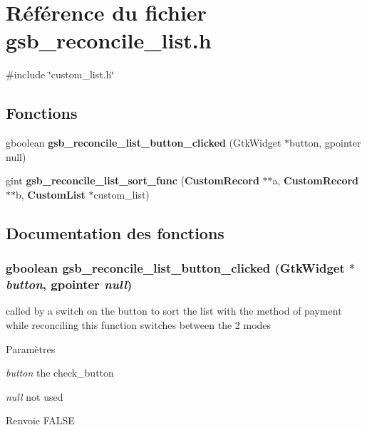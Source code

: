 \section{Référence du fichier gsb\_\-reconcile\_\-list.h}
\label{gsb__reconcile__list_8h}
{\ttfamily \#include \char`\"{}custom\_\-list.h\char`\"{}}\par
\subsection*{Fonctions}
\begin{DoxyCompactItemize}
\item 
gboolean {\bf gsb\_\-reconcile\_\-list\_\-button\_\-clicked} (GtkWidget $\ast$button, gpointer null)
\item 
gint {\bf gsb\_\-reconcile\_\-list\_\-sort\_\-func} ({\bf CustomRecord} $\ast$$\ast$a, {\bf CustomRecord} $\ast$$\ast$b, {\bf CustomList} $\ast$custom\_\-list)
\end{DoxyCompactItemize}


\subsection{Documentation des fonctions}
\subsubsection[{gsb\_\-reconcile\_\-list\_\-button\_\-clicked}]{\setlength{\rightskip}{0pt plus 5cm}gboolean gsb\_\-reconcile\_\-list\_\-button\_\-clicked (GtkWidget $\ast$ {\em button}, \/  gpointer {\em null})}\label{gsb__reconcile__list_8h_a247eaf28cea2bed53eb6048878100f35}
called by a switch on the button to sort the list with the method of payment while reconciling this function switches between the 2 modes


\begin{DoxyParams}{Paramètres}
\item[{\em button}]the check\_\-button \item[{\em null}]not used\end{DoxyParams}
\begin{DoxyReturn}{Renvoie}
FALSE 
\end{DoxyReturn}


